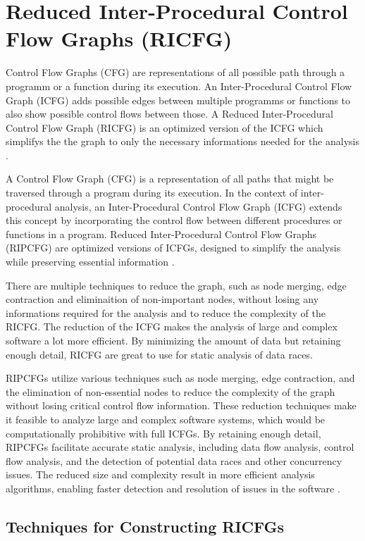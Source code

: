 \documentclass[
fancyheadings, %
%
%
]{stsreprt}
\begin{document}
{\section{Reduced Inter-Procedural Control Flow Graphs (RICFG)}
Control Flow Graphs (CFG) are representations of all possible path through a programm or a function during its execution. An Inter-Procedural Control Flow Graph (ICFG) adds possible edges between multiple programms or functions to also show possible control flows between those. A Reduced Inter-Procedural Control Flow Graph (RICFG) is an optimized version of the ICFG which simplifys the the graph to only the necessary informations needed for the analysis \cite{engler2003}.


A Control Flow Graph (CFG) is a representation of all paths that might be traversed through a program during its execution. In the context of inter-procedural analysis, an Inter-Procedural Control Flow Graph (ICFG) extends this concept by incorporating the control flow between different procedures or functions in a program. Reduced Inter-Procedural Control Flow Graphs (RIPCFG) are optimized versions of ICFGs, designed to simplify the analysis while preserving essential information \cite{engler2003}.

There are multiple techniques to reduce the graph, such as node merging, edge contraction and eliminaition of non-important nodes, without losing any informations required for the analysis and to reduce the complexity of the RICFG. The reduction of the ICFG makes the analysis of large and complex software a lot more efficient. By minimizing the amount of data but retaining enough detail, RICFG are great to use for static analysis of data races. 

RIPCFGs utilize various techniques such as node merging, edge contraction, and the elimination of non-essential nodes to reduce the complexity of the graph without losing critical control flow information. These reduction techniques make it feasible to analyze large and complex software systems, which would be computationally prohibitive with full ICFGs. By retaining enough detail, RIPCFGs facilitate accurate static analysis, including data flow analysis, control flow analysis, and the detection of potential data races and other concurrency issues. The reduced size and complexity result in more efficient analysis algorithms, enabling faster detection and resolution of issues in the software \cite{wang2020}.

\subsection{Techniques for Constructing RICFGs}

}
\end{document}
